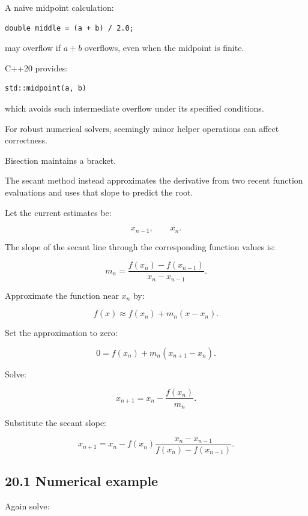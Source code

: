 \hypertarget{02-foundations-ii-ch028-numerically-stable-midpoint}{}

A naive midpoint calculation:

\begin{verbatim}
double middle = (a + b) / 2.0;
\end{verbatim}

may overflow if \(a+b\) overflows, even when the midpoint is finite.

C++20 provides:

\begin{verbatim}
std::midpoint(a, b)
\end{verbatim}

which avoids such intermediate overflow under its specified conditions.

For robust numerical solvers, seemingly minor helper operations can affect correctness.

Bisection maintains a bracket.

The secant method instead approximates the derivative from two recent function evaluations and uses that slope to predict the root.

Let the current estimates be:

\[ x_{n-1},\qquad x_n. \]

The slope of the secant line through the corresponding function values is:

\[ \boxed{ m_n= \frac{ f(x_n)-f(x_{n-1}) }{ x_n-x_{n-1} } }. \]

Approximate the function near \(x_n\) by:

\[ f(x)\approx f(x_n)+m_n(x-x_n). \]

Set the approximation to zero:

\[ 0=f(x_n)+m_n(x_{n+1}-x_n). \]

Solve:

\[ x_{n+1}=x_n-\frac{f(x_n)}{m_n}. \]

Substitute the secant slope:

\[ \boxed{ x_{n+1} = x_n- f(x_n) \frac{x_n-x_{n-1}} {f(x_n)-f(x_{n-1})} }. \]

\subsection{20.1 Numerical example}\label{02-foundations-ii-ch028-numerical-example-2}

\hypertarget{02-foundations-ii-ch028-numerical-example-2}{}

Again solve:

